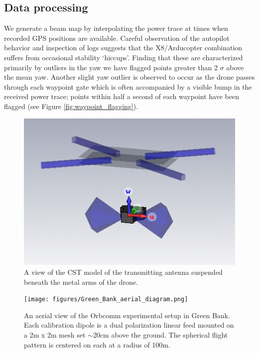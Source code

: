 \documentclass[preprint2,numberedappendix,tighten,twocolappendix]{aastex6}
\begin{document}
\subsection{Data processing}
\label{sec:processing}
We generate a beam map by interpolating the power trace at times when recorded GPS positions are available.  Careful observation of the autopilot behavior and inspection of logs suggests that the X8/Arducopter combination suffers from occasional stability `hiccups'. Finding that these are characterized primarily by outliers in the yaw we have flagged points greater than 2 $\sigma$ above the mean yaw.  Another slight yaw outlier is observed to occur as the drone passes through each waypoint gate which is often accompanied by a visible bump in the received power trace; points within half a second of each waypoint have been flagged (see Figure \ref{fig:waypoint_flagging}).

\begin{figure}
\includegraphics[width=\columnwidth]{figures/drone_antenna_screenshot.png}
\caption{A view of the CST model of the transmitting antenna suspended beneath the metal arms of the drone.}\label{fig:tx_cst}
\end{figure}




\begin{figure}
\begin{center}
\texttt{[image: figures/Green\_Bank\_aerial\_diagram.png]}
\caption{An aerial view of the Orbcomm experimental setup in Green Bank. Each calibration dipole is a dual polarization linear feed mounted on a 2m x 2m mesh set $\sim$20cm above the ground. The spherical flight pattern is centered on each at a radius of 100m.}
\label{fig:GB_aerial}
\end{center}
\end{figure}
\end{document}
